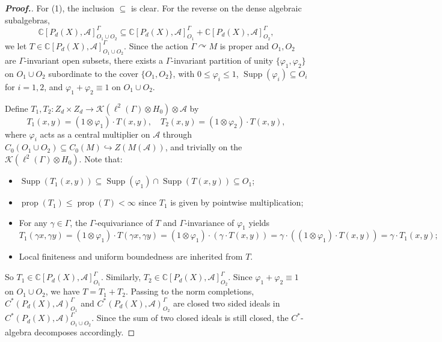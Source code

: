 \documentclass[pdflatex]{sn-jnl}
\theoremstyle{plain}
\theoremstyle{definition}
\begin{document}
\begin{proof}[\textbf{Proof.}]\normalsize
For (1), the inclusion $\subseteq$ is clear. For the reverse on the dense algebraic subalgebras,
\[\mathbb{C}[P_{d}(X),\mathcal{A}]^{\Gamma}_{O_{1}\cup O_{2}}\subseteq\mathbb{C}[P_{d}(X),\mathcal{A}]^{\Gamma}_{O_{1}} + \mathbb{C}[P_{d}(X),\mathcal{A}]^{\Gamma}_{O_{2}},\]
we let $T\in\mathbb{C}[P_{d}(X),\mathcal{A}]_{O_1 \cup O_2}^\Gamma$. Since the action $\Gamma\curvearrowright M$ is proper and $O_1,O_2$ are $\Gamma$-invariant open subsets, there exists a $\Gamma$-invariant partition of unity $\{\varphi_1,\varphi_2\}$ on $O_1 \cup O_2$ subordinate to the cover $\{O_1, O_2\}$, with $0\le\varphi_i\le 1$, $\operatorname{Supp}(\varphi_i) \subseteq O_i$ for $i=1, 2$, and $\varphi_1+\varphi_2\equiv 1$ on $O_1\cup O_2$.

Define $T_1,T_2: Z_{d}\times Z_{d}\to\mathcal{K}(\ell^2(\Gamma)\otimes H_0)\otimes\mathcal{A}$ by
\[
T_1(x, y)=(1\otimes\varphi_1)\cdot T(x, y),\quad 
T_2(x, y)=(1\otimes\varphi_2)\cdot T(x, y),\]
where $\varphi_i$ acts as a central multiplier on $\mathcal{A}$ through $C_0(O_1\cup O_2)\subseteq C_0(M)\hookrightarrow Z(M(\mathcal{A}))$, and trivially on the $\mathcal{K}(\ell^2(\Gamma)\otimes H_0)$. Note that:
\begin{itemize}
\item[(a)] $\operatorname{Supp}(T_1(x,y))\subseteq\operatorname{Supp}(\varphi_1)\cap\operatorname{Supp}(T(x,y))\subseteq O_1$;
\item[(b)] $\operatorname{prop}(T_1)\leq \operatorname{prop}(T)<\infty$ since $T_1$ is given by pointwise multiplication;
\item[(c)] For any $\gamma\in\Gamma$, the $\Gamma$-equivariance of $T$ and $\Gamma$-invariance of $\varphi_1$ yields
\[T_1(\gamma x,\gamma y)=(1\otimes\varphi_1)\cdot T(\gamma x,\gamma y)=(1\otimes\varphi_1)\cdot(\gamma \cdot T(x,y))=\gamma\cdot((1\otimes\varphi_1)\cdot T(x, y))=\gamma\cdot T_1(x, y);\]
\item[(d)] Local finiteness and uniform boundedness are inherited from $T$.
\end{itemize}
So $T_1\in\mathbb{C}[P_{d}(X),\mathcal{A}]_{O_1}^\Gamma$. Similarly, $T_2\in \mathbb{C}[P_{d}(X),\mathcal{A}]_{O_2}^\Gamma$. Since $\varphi_1+\varphi_2\equiv 1$ on $O_1\cup O_2$, we have $T=T_1+T_2$. Passing to the norm completions, $C^{*}(P_{d}(X),\mathcal{A})_{O_1}^\Gamma$ and $C^{*}(P_{d}(X),\mathcal{A})_{O_2}^\Gamma$ are closed two sided ideals in $C^{*}(P_{d}(X),\mathcal{A})_{O_1\cup O_2}^\Gamma$. Since the sum of two closed ideals is still closed, the $C^*$-algebra decomposes accordingly.


\end{proof}
\end{document}
